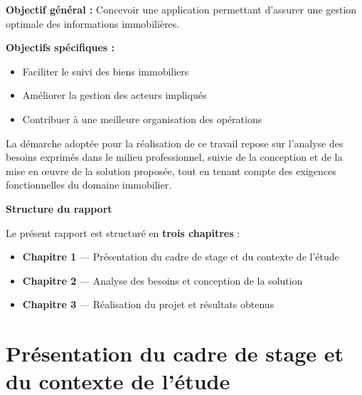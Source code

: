 \documentclass[12pt,a4paper]{report}
\newcommand{\motcle}[1]{\textcolor{marine}{\textbf{#1}}}
\begin{document}
\begin{accentbox}
\textbf{Objectif général :} Concevoir une application permettant d'assurer une gestion optimale des informations immobilières.

\vspace{0.2cm}
\textbf{Objectifs spécifiques :}
\begin{itemize}\\
	
    \item Faciliter le suivi des biens immobiliers
    \item Améliorer la gestion des acteurs impliqués
    \item Contribuer à une meilleure organisation des opérations
\end{itemize}
\end{accentbox}

\vspace{0.4cm}

La démarche adoptée pour la réalisation de ce travail repose sur l'analyse des besoins exprimés dans le milieu professionnel, suivie de la conception et de la mise en œuvre de la solution proposée, tout en tenant compte des exigences fonctionnelles du domaine immobilier.



\vspace{2cm}

\begin{infobox}

\textbf{Structure du rapport}

\vspace{0.2cm}
Le présent rapport est structuré en \motcle{trois chapitres} :
\begin{itemize}
    \item \textbf{Chapitre 1} — Présentation du cadre de stage et du contexte de l'étude
    \item \textbf{Chapitre 2} — Analyse des besoins et conception de la solution
    \item \textbf{Chapitre 3} — Réalisation du projet et résultats obtenus
\end{itemize}
\end{infobox}

\newpage

\chapter{Présentation du cadre de stage et du contexte de l'étude}
\end{document}
